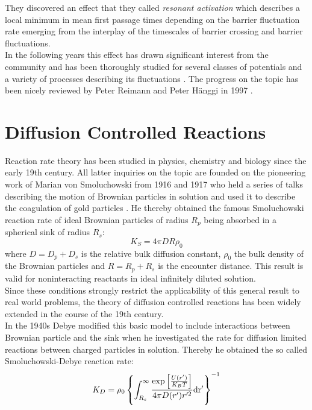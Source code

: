  They discovered an effect that they called \emph{resonant activation} which describes a local minimum in mean first passage times depending on the barrier fluctuation rate emerging from the interplay of the timescales of barrier crossing and barrier fluctuations. \\
In the following years this effect has drawn significant interest from the community and has been thoroughly studied for several classes of potentials and a variety of processes describing its fluctuations \cite{Zurcher1993, Pechukas1994, Reimann1995, Reimann1995a}. The progress on the topic has been nicely reviewed by Peter Reimann and Peter H\"{a}nggi in 1997 \cite{Reimann1997}.

\section{Diffusion Controlled Reactions}
Reaction rate theory has been studied in physics, chemistry and biology since the early 19th century. All latter inquiries on the topic are founded on the pioneering work of Marian von Smoluchowski from 1916 and 1917 who held a series of talks \cite{Smoluchowski1916} describing the motion of Brownian particles in solution and used it to describe the coagulation of gold particles \cite{Smoluchowski1917a}. He thereby obtained the famous Smoluchowski reaction rate of ideal Brownian particles of radius $R_p$ being absorbed in a spherical sink of radius $R_s$:\\
\begin{equation}
    K_S = 4 \pi D R \rho_0 \nonumber
    \label{Ksintro}
\end{equation}
where $D = D_p + D_s$ is the relative bulk diffusion constant, $\rho_0$ the bulk density of the Brownian particles and $R = R_p + R_s$ is the encounter distance. This result is valid for noninteracting reactants in ideal infinitely diluted solution. \\ 
Since these conditions strongly restrict the applicability of this general result to real world problems, the theory of diffusion controlled reactions has been widely extended in the course of the 19th century.\\
In the 1940s Debye \cite{Debye1942} modified this basic model to include interactions between Brownian particle and the sink when he investigated the rate for diffusion limited reactions between charged particles in solution. Thereby he obtained the so called Smoluchowski-Debye reaction rate:
\begin{equation}
    K_D = \rho_0\left\{\int_{R_s}^{\infty} \frac{\exp \left[ \frac{U(r')}{K_B T}\right]}{4 \pi D(r') r'^2} \rm d r' \right\}^{-1} \nonumber
    \label{Kdintro}
\end{equation}

